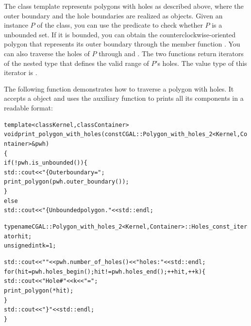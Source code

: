 The class template 
represents polygons with holes as described above, where the outer
boundary and the hole boundaries are realized as
 objects. Given an instance $P$ of
the  class, you can use the predicate
 to check whether $P$ is a unbounded set. If it is
bounded, you can obtain the counterclockwise-oriented polygon that
represents its outer boundary through the member function
. You can also traverse the holes of $P$ through
 and . The two functions return
iterators of the nested type
 that  
defines the valid range of $P$'s holes. The value type of this
iterator is .

The following function demonstrates how to traverse a polygon with holes.
It accepts a  object and uses the auxiliary
function  to prints all its components in a readable
format:
\begin{alltt}
template<class Kernel, class Container>
void print_polygon_with_holes(const CGAL::Polygon_with_holes_2<Kernel, Container> & pwh)
\{
  if (! pwh.is_unbounded()) \{
    std::cout << "\{ Outer boundary = "; 
    print_polygon (pwh.outer_boundary());
  \}
  else
    std::cout << "\{ Unbounded polygon." << std::endl;

  typename CGAL::Polygon_with_holes_2<Kernel,Container>::Holes_const_iterator hit;
  unsigned int k = 1;

  std::cout << "  " << pwh.number_of_holes() << " holes:" << std::endl;
  for (hit = pwh.holes_begin(); hit != pwh.holes_end(); ++hit, ++k) \{
    std::cout << "    Hole #" << k << " = ";
    print_polygon (*hit);
  \}
  std::cout << " \}" << std::endl;
\}
\end{alltt}

